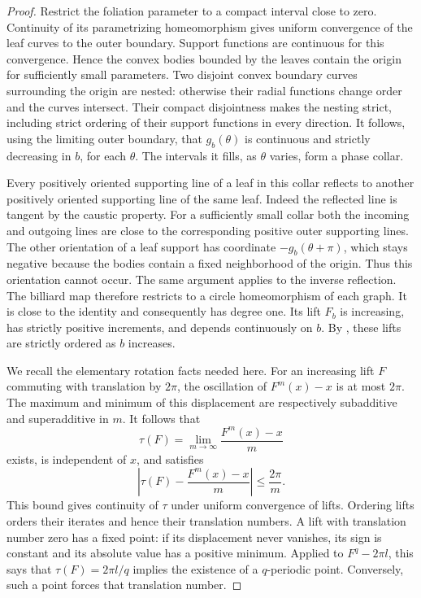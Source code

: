 \begin{proof}
Restrict the foliation parameter to a compact interval close to zero.
Continuity of its parametrizing homeomorphism gives uniform convergence
of the leaf curves to the outer boundary.  Support functions are
continuous for this convergence.  Hence the convex bodies bounded by
the leaves contain the origin for sufficiently small parameters.
Two disjoint convex boundary curves surrounding the origin are nested:
otherwise their radial functions change order and the curves intersect.
Their compact disjointness makes the nesting strict, including strict
ordering of their support functions in every direction.  It follows,
using the limiting outer boundary, that \(g_b(\theta)\) is continuous
and strictly decreasing in \(b\), for each \(\theta\).
The intervals it fills, as \(\theta\) varies, form a phase collar.

Every positively oriented supporting line of a leaf in this collar
reflects to another positively oriented supporting line of the same
leaf.  Indeed the reflected line is tangent by the caustic property.
For a sufficiently small collar both the incoming and outgoing lines
are close to the corresponding positive outer supporting lines.
The other orientation of a leaf support has coordinate
\(-g_b(\theta+\pi)\), which stays negative because the bodies contain
a fixed neighborhood of the origin.  Thus this orientation cannot
occur.  The same argument applies to the inverse reflection.
The billiard map therefore restricts to a circle homeomorphism of each
graph.  It is close to the identity and consequently has degree one.
Its lift \(F_b\) is increasing, has strictly positive increments, and
depends continuously on \(b\).  By , these lifts are
strictly ordered as \(b\) increases.

We recall the elementary rotation facts needed here.  For an increasing
lift \(F\) commuting with translation by \(2\pi\), the oscillation of
\(F^m(x)-x\) is at most \(2\pi\).  The maximum and minimum of this
displacement are respectively subadditive and superadditive in \(m\).
It follows that
\[
\tau(F)=\lim_{m\to\infty}\frac{F^m(x)-x}{m}
\]
exists, is independent of \(x\), and satisfies
\[
\left|\tau(F)-\frac{F^m(x)-x}{m}\right|\le\frac{2\pi}{m}.
\]
This bound gives continuity of \(\tau\) under uniform convergence of
lifts.  Ordering lifts orders their iterates and hence their translation
numbers.  A lift with translation number zero has a fixed point: if its
displacement never vanishes, its sign is constant and its absolute value
has a positive minimum.  Applied to \(F^q-2\pi l\), this says that
\(\tau(F)=2\pi l/q\) implies the existence of a \(q\)-periodic point.
Conversely, such a point forces that translation number.


\end{proof}
